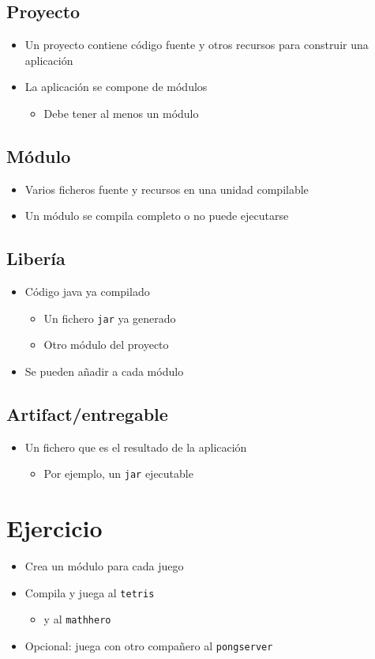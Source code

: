 \documentclass[a4paper]{article}
\begin{document}
\subsection{Proyecto}
\label{sec:org0000033}
\begin{itemize}
\item Un proyecto contiene código fuente y otros recursos para construir una aplicación
\item La aplicación se compone de módulos
\begin{itemize}
\item Debe tener al menos un módulo
\end{itemize}
\end{itemize}
\subsection{Módulo}
\label{sec:org0000036}
\begin{itemize}
\item Varios ficheros fuente y recursos en una unidad compilable
\item Un módulo se compila completo o no puede ejecutarse
\end{itemize}
\subsection{Libería}
\label{sec:org0000039}
\begin{itemize}
\item Código java ya compilado
\begin{itemize}
\item Un fichero \texttt{jar} ya generado
\item Otro módulo del proyecto
\end{itemize}
\item Se pueden añadir a cada módulo
\end{itemize}
\subsection{Artifact/entregable}
\label{sec:org000003c}
\begin{itemize}
\item Un fichero que es el resultado de la aplicación
\begin{itemize}
\item Por ejemplo, un \texttt{jar} ejecutable
\end{itemize}
\end{itemize}
\section{Ejercicio}
\label{sec:org0000042}
\begin{itemize}
\item Crea un módulo para cada juego
\item Compila y juega al \texttt{tetris}
\begin{itemize}
\item y al \texttt{mathhero}
\end{itemize}
\item Opcional: juega con otro compañero al \texttt{pongserver}
\end{itemize}
\end{document}
